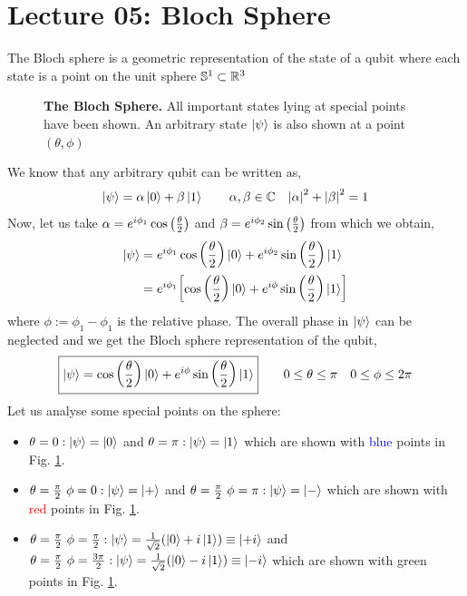 \section*{Lecture 05: Bloch Sphere}
The Bloch sphere is a geometric representation of the state of a qubit where each state is a point on the unit sphere $\mathbb{S}^1\subset \mathbb{R}^3$
\begin{figure}[H]
    \centering 
    
    \caption{\textbf{The Bloch Sphere. }All important states lying at special points have been shown. An arbitrary state $\ket{\psi}$ is also shown at a point $(\theta,\phi)$}
    \label{blochsph}
\end{figure}
\noindent
We know that any arbitrary qubit can be written as,
$$\ket{\psi} = \alpha\ket{0}+\beta\ket{1}\qquad \alpha,\beta\in \mathbb{C} \quad \abs{\alpha}^2+\abs{\beta}^2=1$$
Now, let us take $\alpha = e^{i\phi_1}\cos\qty(\frac{\theta}{2})$ and $\beta = e^{i\phi_2}\sin\qty(\frac{\theta}{2})$ from which we obtain,
\begin{align}
    \begin{split}
        \ket{\psi}&=e^{i\phi_1}\cos\qty(\frac{\theta}{2})\ket{0}+e^{i\phi_2}\sin\qty(\frac{\theta}{2})\ket{1}\\
        &=e^{i\phi_1}\qty[\cos\qty(\frac{\theta}{2})\ket{0}+ e^{i\phi}\sin\qty(\frac{\theta}{2})\ket{1}]
    \end{split}
\end{align}
where $\phi:=\phi_1-\phi_1$ is the relative phase. The overall phase in $\ket{\psi}$ can be neglected and we get the Bloch sphere representation of the qubit,
\begin{equation}
    \boxed{\ket{\psi} = \cos\qty(\frac{\theta}{2})\ket{0}+ e^{i\phi}\sin\qty(\frac{\theta}{2})\ket{1}}\qquad 0\leq \theta\leq \pi \quad 0\leq \phi \leq 2\pi
\end{equation}
Let us analyse some special points on the sphere: 
\begin{itemize}
    \item $\theta=0: \ket{\psi} = \ket{0}$ and $\theta=\pi: \ket{\psi} = \ket{1}$ which are shown with \textcolor{blue}{blue} points in Fig. \ref{blochsph}.
    \item $\theta=\frac{\pi}{2}\ \phi=0: \ket{\psi} = \ket{+}$ and $\theta=\frac{\pi}{2}\ \phi=\pi: \ket{\psi} = \ket{-}$ which are shown with \textcolor{red}{red} points in Fig. \ref{blochsph}.
    \item $\theta=\frac{\pi}{2}\ \phi=\frac{\pi}{2}: \ket{\psi} =\frac{1}{\sqrt{2}} \qty(\ket{0}+i\ket{1})\equiv \ket{+i}$ and $\theta=\frac{\pi}{2}\ \phi=\frac{3\pi}{2}: \ket{\psi} = \frac{1}{\sqrt{2}} \qty(\ket{0}-i\ket{1})\equiv \ket{-i}$ which are shown with \textcolor{OliveGreen}{green} points in Fig. \ref{blochsph}.
\end{itemize}
